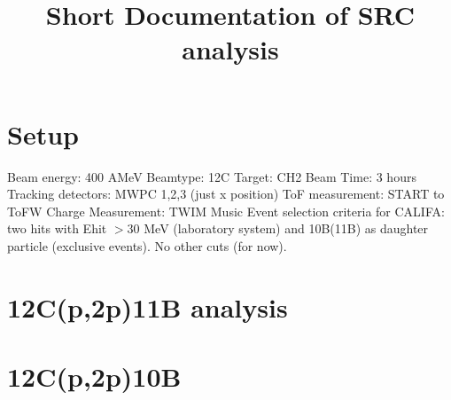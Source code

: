 \documentclass{report}
\title{Short Documentation of SRC analysis}
\begin{document}
\maketitle

\section{Setup}
Beam energy: 400 AMeV\newline
Beamtype: 12C\newline
Target: CH2\newline
Beam Time: 3 hours\newline
Tracking detectors: MWPC 1,2,3 (just x position)\newline
ToF measurement: START to ToFW\newline
Charge Measurement: TWIM Music\newline
Event selection criteria for CALIFA: two hits with E\textunderscore hit $> 30$ MeV (laboratory system) and 10B(11B) as daughter particle (exclusive events).\newline
No other cuts (for now).\newline

\section{12C(p,2p)11B analysis}

\section{12C(p,2p)10B}
\end{document}
